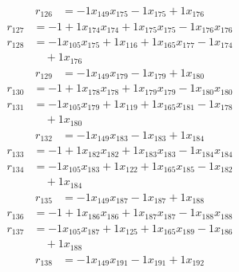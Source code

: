 \[\begin{aligned}
r_{126} &= - 1 x_{149} x_{175} - 1 x_{175} + 1 x_{176}
\end{aligned}\]
\[\begin{aligned}
r_{127} &= - 1 + 1 x_{174} x_{174} + 1 x_{175} x_{175} - 1 x_{176} x_{176}
\end{aligned}\]
\[\begin{aligned}
r_{128} &= - 1 x_{105} x_{175} + 1 x_{116} + 1 x_{165} x_{177} - 1 x_{174} \\
 &\quad + 1 x_{176}
\end{aligned}\]
\[\begin{aligned}
r_{129} &= - 1 x_{149} x_{179} - 1 x_{179} + 1 x_{180}
\end{aligned}\]
\[\begin{aligned}
r_{130} &= - 1 + 1 x_{178} x_{178} + 1 x_{179} x_{179} - 1 x_{180} x_{180}
\end{aligned}\]
\[\begin{aligned}
r_{131} &= - 1 x_{105} x_{179} + 1 x_{119} + 1 x_{165} x_{181} - 1 x_{178} \\
 &\quad + 1 x_{180}
\end{aligned}\]
\[\begin{aligned}
r_{132} &= - 1 x_{149} x_{183} - 1 x_{183} + 1 x_{184}
\end{aligned}\]
\[\begin{aligned}
r_{133} &= - 1 + 1 x_{182} x_{182} + 1 x_{183} x_{183} - 1 x_{184} x_{184}
\end{aligned}\]
\[\begin{aligned}
r_{134} &= - 1 x_{105} x_{183} + 1 x_{122} + 1 x_{165} x_{185} - 1 x_{182} \\
 &\quad + 1 x_{184}
\end{aligned}\]
\[\begin{aligned}
r_{135} &= - 1 x_{149} x_{187} - 1 x_{187} + 1 x_{188}
\end{aligned}\]
\[\begin{aligned}
r_{136} &= - 1 + 1 x_{186} x_{186} + 1 x_{187} x_{187} - 1 x_{188} x_{188}
\end{aligned}\]
\[\begin{aligned}
r_{137} &= - 1 x_{105} x_{187} + 1 x_{125} + 1 x_{165} x_{189} - 1 x_{186} \\
 &\quad + 1 x_{188}
\end{aligned}\]
\[\begin{aligned}
r_{138} &= - 1 x_{149} x_{191} - 1 x_{191} + 1 x_{192}
\end{aligned}\]
